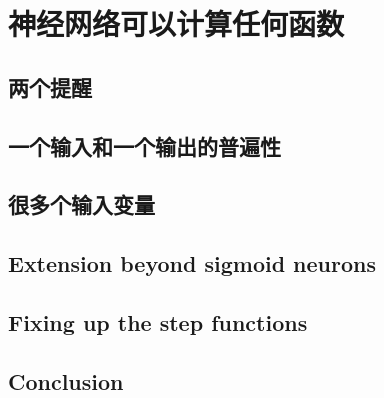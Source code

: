 
\chapter{神经网络可以计算任何函数}
\label{ch:VisualProof}

\section{两个提醒}
\label{sec:two_caveats}

\section{一个输入和一个输出的普遍性}
\label{sec:universality_with_one_input_and_one_output}

\section{很多个输入变量}
\label{sec:many_input_variables}

\section{Extension beyond sigmoid neurons}
\label{sec:extension_beyond_sigmoid_neurons}

\section{Fixing up the step functions}
\label{sec:fixing_up_the_step_functions}

\section{Conclusion}
\label{sec:conclusion}
